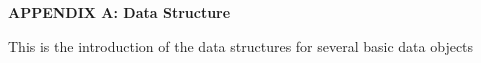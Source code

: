 \newpage
\begin{center}
{\large\bf APPENDIX A: Data Structure}
\end{center}
This is the introduction of the data structures for
several basic data objects


